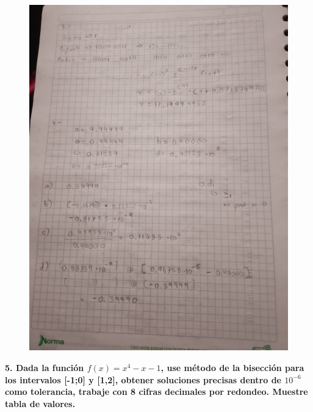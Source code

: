 \documentclass[12pt]{article}
\begin{document}
\begin{figure}[H]
\centering
\includegraphics[width=1\textwidth]{./inFiles/Figures/9.jpeg}
\end{figure}

\textbf{5. Dada la función $f(x) = x^4 - x - 1$, use método de la bisección para los intervalos [-1;0] y [1,2], obtener soluciones precisas dentro de $10^{-6}$ como tolerancia, trabaje con 8 cifras decimales por redondeo. Muestre tabla de valores.} 
\end{document}
